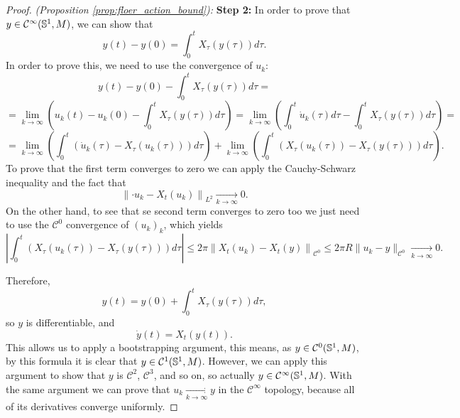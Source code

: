 \begin{proof} {\it (Proposition \ref{prop:floer_action_bound}):}
{\bf Step 2:} In order to prove that $y \in \mathcal{C}^{\infty}(\mathbb{S}^1,M)$, we can show that
\[y(t)-y(0) = \int_0^t X_{\tau}(y(\tau)) d\tau .\]
In order to prove this, we need to use the convergence of $u_k$:
\[y(t)-y(0)-\int_0^t X_{\tau}(y(\tau)) d\tau =\]
\[= \lim_{k\rightarrow\infty} \left( u_k(t) - u_k(0) - \int_0^t X_{\tau}(y(\tau)) d\tau \right) = \lim_{k\rightarrow\infty} \left( \int_0^t \dot{u}_k(\tau)d\tau - \int_0^t X_{\tau}(y(\tau)) d\tau \right) =\]
\[= \lim_{k\rightarrow\infty} \left( \int_0^t \left( \dot{u}_k(\tau) - X_{\tau}(u_k(\tau)) \right) d\tau \right) + \lim_{k\rightarrow\infty} \left( \int_0^t \left( X_{\tau}(u_k(\tau)) - X_{\tau}(y(\tau)) \right) d\tau \right) .\]
To prove that the first term converges to zero we can apply the Cauchy-Schwarz inequality and the fact that
\[\left\|\cdot{u}_k - X_t(u_k)\right\|_{L^2} \xrightarrow[k\rightarrow\infty]{} 0.\]
On the other hand, to see that se second term converges to zero too we just need to use the $\mathcal{C}^0$ convergence of $(u_k)_k$, which yields
\[\left| \int_0^t \left( X_{\tau}(u_k(\tau)) - X_{\tau}(y(\tau)) \right) d\tau \right| \leq 2\pi \left\| X_t(u_k) - X_t(y) \right\|_{\mathcal{C}^0} \leq 2\pi R \| u_k - y \|_{\mathcal{C}^0} \xrightarrow[k\rightarrow\infty]{} 0 .\]

Therefore,
\[y(t) = y(0) + \int_0^t X_{\tau}(y(\tau)) d\tau ,\]
so $y$ is differentiable, and
\[\dot{y}(t) = X_t(y(t)) .\]
This allows us to apply a bootstrapping argument, this means, as $y \in \mathcal{C}^0(\mathbb{S}^1,M)$, by this formula it is clear that $y \in \mathcal{C}^1(\mathbb{S}^1,M)$. However, we can apply this argument to show that $y$ is $\mathcal{C}^2$, $\mathcal{C}^3$, and so on, so actually $y \in \mathcal{C}^{\infty}(\mathbb{S}^1,M)$. With the same argument we can prove that $u_k \xrightarrow[k\rightarrow\infty]{} y$ in the $\mathcal{C}^{\infty}$ topology, because all of its derivatives converge uniformly.


\end{proof}
